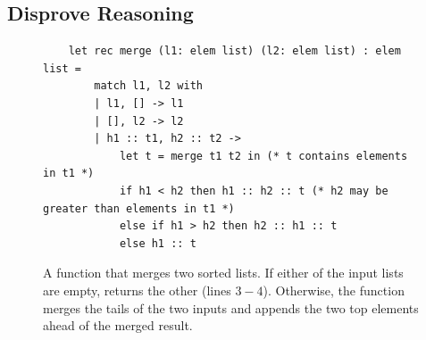 \subsection{Disprove Reasoning}\label{subsec:disprove}


\begin{figure}[h!]
    \centering
\begin{verbatim}
    let rec merge (l1: elem list) (l2: elem list) : elem list =
        match l1, l2 with
        | l1, [] -> l1
        | [], l2 -> l2
        | h1 :: t1, h2 :: t2 ->
            let t = merge t1 t2 in (* t contains elements in t1 *)
            if h1 < h2 then h1 :: h2 :: t (* h2 may be greater than elements in t1 *)
            else if h1 > h2 then h2 :: h1 :: t
            else h1 :: t
\end{verbatim}
\caption{A function that merges two sorted lists. If either of
the input lists are empty,  returns the other (lines
$3-4$). Otherwise, the function merges the tails of the two inputs and appends the two top elements ahead of the merged result. }
\label{fig:merge}
\end{figure}

